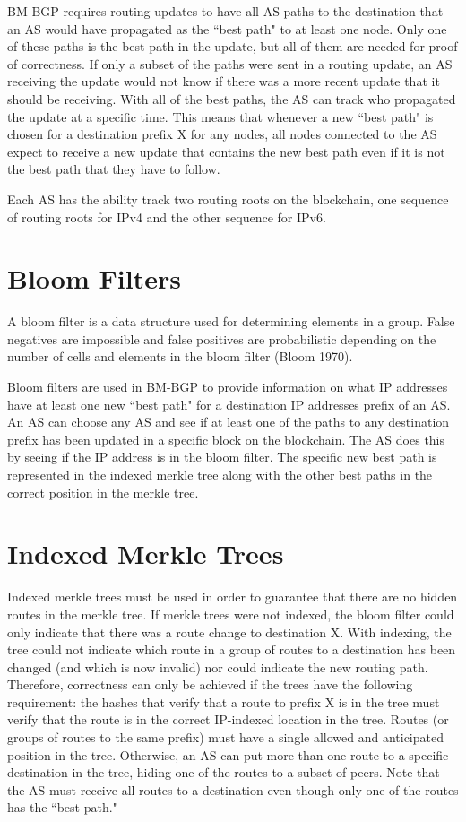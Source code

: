 \documentclass[letterpaper, 10 pt, conference]{ieeeconf}  %
\begin{document}
BM-BGP requires routing updates to have all AS-paths to the destination that an AS would have propagated as the ``best path" to at least one node. Only one of these paths is the best path in the update, but all of them are needed for proof of correctness. If only a subset of the paths were sent in a routing update, an AS receiving the update would not know if there was a more recent update that it should be receiving. With all of the best paths, the AS can track who propagated the update at a specific time. This means that whenever a new ``best path" is chosen for a destination prefix X for any nodes, all nodes connected to the AS expect to receive a new update that contains the new best path even if it is not the best path that they have to follow. 

Each AS has the ability track two routing roots on the blockchain, one sequence of routing roots for IPv4 and the other sequence for IPv6. 

\section{Bloom Filters}
A bloom filter is a data structure used for determining elements in a group. False negatives are impossible and false positives are probabilistic depending on the number of cells and elements in the bloom filter (Bloom 1970). 

Bloom filters are used in BM-BGP to provide information on what IP addresses have at least one new ``best path" for a destination IP addresses prefix of an AS. An AS can choose any AS and see if at least one of the paths to any destination prefix has been updated in a specific block on the blockchain. The AS does this by seeing if the IP address is in the bloom filter. The specific new best path is represented in the indexed merkle tree along with the other best paths in the correct position in the merkle tree.

\section{Indexed Merkle Trees}
Indexed merkle trees must be used in order to guarantee that there are no hidden routes in the merkle tree. If merkle trees were not indexed, the bloom filter could only indicate that there was a route change to destination X. With indexing, the tree could not indicate which route in a group of routes to a destination has been changed (and which is now invalid) nor could indicate the new routing path. Therefore, correctness can only be achieved if the trees have the following requirement: the hashes that verify that a route to prefix X is in the tree must verify that the route is in the correct IP-indexed location in the tree. Routes (or groups of routes to the same prefix) must have a single allowed and anticipated position in the tree. Otherwise, an AS can put more than one route to a specific destination in the tree, hiding one of the routes to a subset of peers. Note that the AS must receive all routes to a destination even though only one of the routes has the ``best path."
\end{document}

